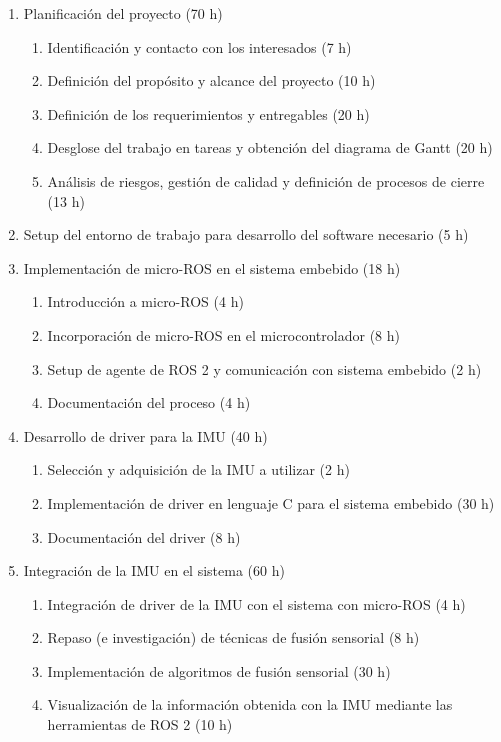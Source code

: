 \documentclass[
11pt, %
codirector, %
]{charter}
\begin{document}
\begin{enumerate}
	\item Planificación del proyecto (70 h)
	\begin{enumerate}
		\item Identificación y contacto con los interesados (7 h)
		\item Definición del propósito y alcance del proyecto (10 h)
		\item Definición de los requerimientos y entregables (20 h)
		\item Desglose del trabajo en tareas y obtención del diagrama de Gantt (20 h)
		\item Análisis de riesgos, gestión de calidad y definición de procesos de cierre (13 h)
	\end{enumerate}
	\item Setup del entorno de trabajo para desarrollo del software necesario (5 h)
	\item Implementación de micro-ROS en el sistema embebido (18 h)
	\begin{enumerate}
		\item Introducción a micro-ROS (4 h)
		\item Incorporación de micro-ROS en el microcontrolador (8 h)
		\item Setup de agente de ROS 2 y comunicación con sistema embebido (2 h)
		\item Documentación del proceso (4 h)
	\end{enumerate}
	\item Desarrollo de driver para la IMU (40 h)
	\begin{enumerate}
		\item Selección y adquisición de la IMU a utilizar (2 h)
		\item Implementación de driver en lenguaje C para el sistema embebido (30 h)
		\item Documentación del driver (8 h)
	\end{enumerate}
	\item Integración de la IMU en el sistema (60 h)
	\begin{enumerate}
		\item Integración de driver de la IMU con el sistema con micro-ROS (4 h)
		\item Repaso (e investigación) de técnicas de fusión sensorial (8 h)
		\item Implementación de algoritmos de fusión sensorial (30 h)
		\item Visualización de la información obtenida con la IMU mediante las herramientas de ROS 2 (10 h)

\end{enumerate}
\end{enumerate}
\end{document}
